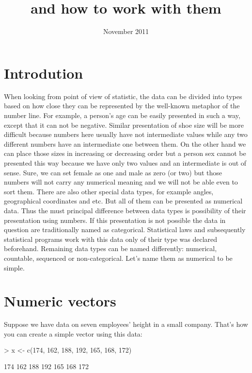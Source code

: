 \documentclass[a4paper,11pt]{scrartcl}
\title{\R \\ and how to work with them}
\date{ November 2011}
\begin{document}
\maketitle

\tableofcontents
\bigskip

\section{Introdution}
\label{sec:intro}



When looking from point of view of statistic, the data can be divided into types based on how close they can be represented by the well-known metaphor of the number line. For example, a person's age can be easily presented in such a way, except that it can not be negative. Similar presentation of shoe size will be more difficult because numbers here usually have not intermediate values while any two different numbers have an intermediate one between them. On the other hand we can place those sizes in increasing or decreasing order but a person sex cannot be presented this way because we have only two values and an intermediate is out of sense. Sure, we can set female as one and male as zero (or two) but those numbers will not carry any numerical meaning and we will not be able even to sort them. There are also other special data types, for example angles, geographical coordinates and  etc. But all of them can be presented as numerical data. Thus the must principal difference between data types is possibility of their presentation using numbers. If this presentation is not possible the data in question are traditionally named as categorical. Statistical laws and subsequently statistical programs work with this data only of their type was declared beforehand. Remaining data types can be named differently: numerical, countable, sequenced or non-categorical. Let’s name them as numerical to be simple.

\section{Numeric vectors}
\label{sec:vectors}


Suppose we have data on seven employees’ height in a small company. That's how you can create a simple vector using this data:

\begin{Schunk}
\begin{Sinput}
> x <- c(174, 162, 188, 192, 165, 168, 172)
\end{Sinput}
\begin{Soutput}
[1] 174 162 188 192 165 168 172
\end{Soutput}
\end{Schunk}
\end{document}

